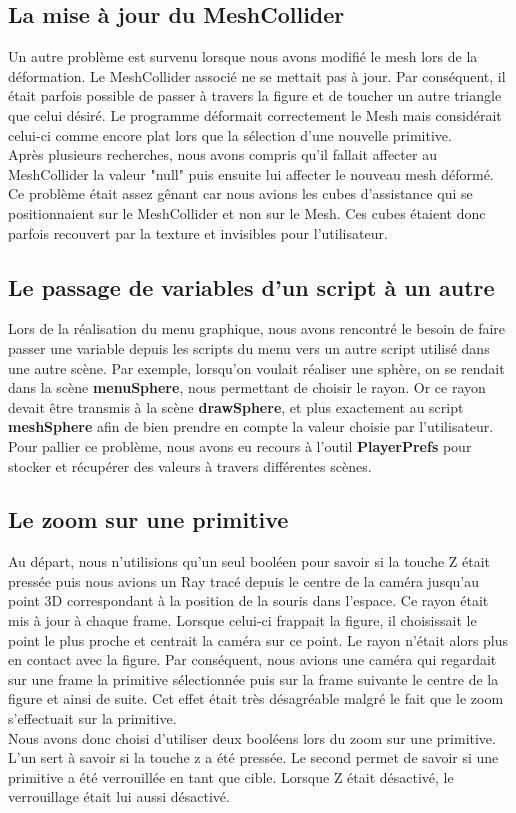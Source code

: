 \documentclass[a4paper,oneside,12pt,titlepage]{article}
\begin{document}
\subsection{La mise à jour du MeshCollider}

Un autre problème est survenu lorsque nous avons modifié le mesh lors de la déformation. Le MeshCollider associé ne se mettait pas à jour. Par conséquent, il était parfois possible de passer à travers la figure et de toucher un autre triangle que celui désiré. Le programme déformait correctement le Mesh mais considérait celui-ci comme encore plat lors que la sélection d'une nouvelle primitive.\\
Après plusieurs recherches, nous avons compris qu'il fallait affecter au MeshCollider la valeur "null" puis ensuite lui affecter le nouveau mesh déformé.\\

Ce problème était assez gênant car nous avions les cubes d'assistance qui se positionnaient sur le MeshCollider et non sur le Mesh. Ces cubes étaient donc parfois recouvert par la texture et invisibles pour l'utilisateur.


\subsection{Le passage de variables d'un script à un autre}

Lors de la réalisation du menu graphique, nous avons rencontré le besoin de faire passer une variable depuis les scripts du menu vers un autre script utilisé dans une autre scène. Par exemple, lorsqu'on voulait réaliser une sphère, on se rendait dans la scène \textbf{menuSphere}, nous permettant de choisir le rayon. Or ce rayon devait être transmis à la scène \textbf{drawSphere}, et plus exactement au script \textbf{meshSphere} afin de bien prendre en compte la valeur choisie par l'utilisateur. Pour pallier ce problème, nous avons eu recours à l'outil \textbf{PlayerPrefs} pour stocker et récupérer des valeurs à travers différentes scènes.


\subsection{Le zoom sur une primitive}
Au départ, nous n'utilisions qu'un seul booléen pour savoir si la touche Z était pressée puis nous avions un Ray tracé depuis le centre de la caméra jusqu'au point 3D correspondant à la position de la souris dans l'espace. Ce rayon était mis à jour à chaque frame. Lorsque celui-ci frappait la figure, il choisissait le point le plus proche et centrait la caméra sur ce point. Le rayon n'était alors plus en contact avec la figure. Par conséquent, nous avions une caméra qui regardait sur une frame la primitive sélectionnée puis sur la frame suivante le centre de la figure et ainsi de suite. Cet effet était très désagréable malgré le fait que le zoom s'effectuait sur la primitive.\\ 
Nous avons donc choisi d'utiliser deux booléens lors du zoom sur une primitive. L'un sert à savoir si la touche z a été pressée. Le second permet de savoir si une primitive a été verrouillée en tant que cible. Lorsque Z était désactivé, le verrouillage était lui aussi désactivé.
\end{document}
